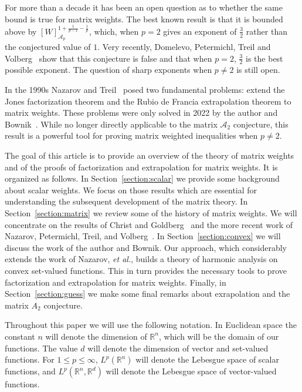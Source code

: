 \documentclass[12pt]{amsart}
\theoremstyle{definition}
\theoremstyle{remark}
\numberwithin{equation}{section}
\newcommand{\R}{\mathbb R}
\newcommand{\rd}{{{\mathbb R}^d}}
\newcommand{\A}{\mathcal A}
\begin{document}
For more than a
decade it has been an open
question as to whether the same bound is true for matrix weights.  The
best known result is that it is bounded above by
$[W]_{\A_p}^{1+\frac{1}{p-1}-\frac{1}{p}}$, which, when $p=2$ gives an
exponent of $\frac{3}{2}$ rather than the conjectured value of $1$.
Very recently, Domelevo, Petermichl, Treil and
Volberg~\cite{DPTV-2024} show that this conjecture is false and that
  when $p=2$, $\frac{3}{2}$ is the best possible exponent.  The
  question of sharp exponents when $p\neq 2$ is still open.
  


In the 1990s
Nazarov and Treil~\cite{MR1428988} posed two fundamental problems:
extend the Jones factorization theorem and the Rubio de Francia
extrapolation theorem to matrix weights.  These problems were only
solved in 2022 by the author and Bownik~\cite{mb-2022}.    While no
longer directly applicable to the matrix $\A_2$ conjecture, this
result is a powerful tool for proving matrix weighted inequalities
when $p\neq 2$.  

\medskip

The goal of this article is to provide an overview of the theory of
matrix weights and of the proofs of
factorization and extrapolation for matrix weights.   It is organized
as follows.  In Section~\ref{section:scalar} we provide some
background about scalar weights.  We focus on those results which are
essential for understanding the subsequent development of the matrix
theory.  In Section~\ref{section:matrix} we review some of the history
of matrix weights.  We will concentrate on the results of Christ and
Goldberg~\cite{MR2015733,CG} and the more recent work of Nazarov,
Petermichl, Treil, and Volberg~\cite{MR3689742}.   In
Section~\ref{section:convex} we will discuss the work of the author
and Bownik.  Our approach, which considerably extends the work of
Nazarov, {\em et al.}, builds a theory of harmonic analysis on
convex set-valued functions. This in turn provides the necessary tools to
prove factorization and extrapolation for matrix weights.  Finally, in
Section~\ref{section:guess} we make some final remarks about
exrapolation and the matrix $A_2$ conjecture.

Throughout this paper we will use the following notation.  In
Euclidean space the constant $n$ will denote the dimension of $\R^n$,
which will be the domain of our functions.  The value $d$ will denote
the dimension of vector and set-valued functions.  For
$1\leq p \leq \infty$, $L^p(\R^n)$ will denote the Lebesgue space of
scalar functions, and $L^p(\R^n,\rd )$ will denote the Lebesgue space
of vector-valued functions.
\end{document}
